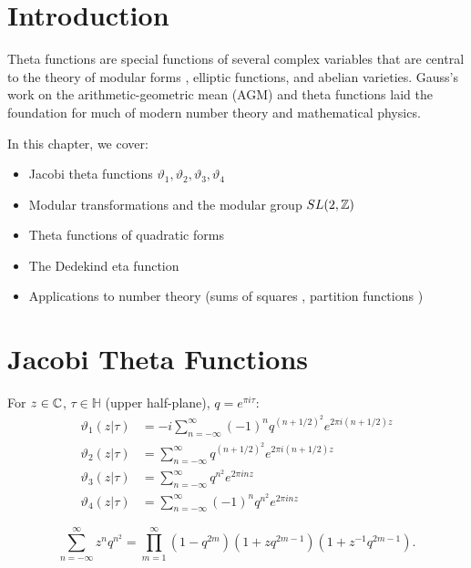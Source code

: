\section{Introduction}

Theta functions  are special functions of several complex variables that are central to the theory of modular forms , elliptic functions, and abelian varieties. Gauss's work on the arithmetic-geometric mean (AGM) and theta functions laid the foundation for much of modern number theory and mathematical physics.

In this chapter, we cover:
\begin{itemize}
    \item Jacobi theta functions  $\vartheta_1, \vartheta_2, \vartheta_3, \vartheta_4$
    \item Modular transformations and the modular group  $SL(2,\mathbb{Z})$
    \item Theta functions of quadratic forms
    \item The Dedekind eta function 
    \item Applications to number theory (sums of squares , partition functions )
\end{itemize}

\section{Jacobi Theta Functions}

\begin{definition}
For $z \in \mathbb{C}$, $\tau \in \mathbb{H}$ (upper half-plane), $q = e^{\pi i \tau}$:
\begin{align*}
\vartheta_1(z|\tau) &= -i \sum_{n=-\infty}^{\infty} (-1)^n q^{(n+1/2)^2} e^{2\pi i (n+1/2)z} \\
\vartheta_2(z|\tau) &= \sum_{n=-\infty}^{\infty} q^{(n+1/2)^2} e^{2\pi i (n+1/2)z} \\
\vartheta_3(z|\tau) &= \sum_{n=-\infty}^{\infty} q^{n^2} e^{2\pi i n z} \\
\vartheta_4(z|\tau) &= \sum_{n=-\infty}^{\infty} (-1)^n q^{n^2} e^{2\pi i n z}
\end{align*}
\end{definition}

\begin{theorem}
\begin{equation}
\sum_{n=-\infty}^{\infty} z^n q^{n^2} = \prod_{m=1}^{\infty}(1-q^{2m})(1+zq^{2m-1})(1+z^{-1}q^{2m-1}).
\end{equation}
\end{theorem}

